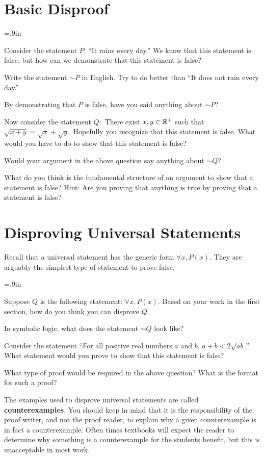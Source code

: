 \section{Basic Disproof}
\begin{question} \itemsep=.9in
\item Consider the statement $P$: ``It rains every day.''  We know that this statement is false, but how can we demonstrate that this statement is false?  
\item Write the statement $\sim P$ in English.  Try to do better than ``It does not rain every day.''
\item By demonstrating that $P$ is false, have you said anything about $\sim P$?
\newpage
\item Now consider the statement $Q:$ There exist $x,y \in \mathbb{R}^+$ such that $\sqrt{x+y} = \sqrt{x} + \sqrt{y}$.  Hopefully you recognize that this statement is false.  What would you have to do to show that this statement is false?
\item Would your argument in the above question say anything about $\sim Q$?
\item What do you think is the fundamental structure of an argument to show that a statement is false?  Hint: Are you proving that anything is true by proving that a statement is false?

\vspace{.9in}
\end{question}

\section{Disproving Universal Statements}
Recall that a universal statement has the generic form $\forall x, P(x)$.  They are arguably the simplest type of statement to prove false.
\begin{question}[resume] \itemsep=.9in
\item Suppose $Q$ is the following statement: $\forall x, P(x)$.  Based on your work in the first section, how do you think you can disprove $Q$.
\item In symbolic logic, what does the statement $\sim Q$ look like?
\item Consider the statement ``For all positive real numbers $a$ and $b$, $a+b < 2 \sqrt{ab}$.''  What statement would you prove to show that this statement is false?
\item What type of proof would be required in the above question?  What is the format for such a proof?
\vspace{.9in}
\end{question}
The examples used to disprove universal statements are called \textbf{counterexamples}.  You should keep in mind that it is the responsibility of the proof writer, and not the proof reader, to explain why a given counterexample is in fact a counterexample.  Often times textbooks will expect the reader to determine why something is a counterexample for the students benefit, but this is unacceptable in most work.

